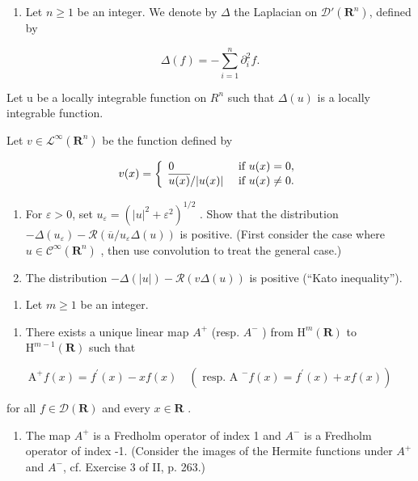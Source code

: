 \begin{enumerate}
\def\labelenumi{\arabic{enumi})}
\setcounter{enumi}{31}
\tightlist
\item
  Let \(n \geqslant 1\) be an integer. We denote by \(\Delta\) the Laplacian on \(\mathcal{D}'(\mathbf{R}^n)\), defined by
\end{enumerate}

\[
\Delta (f) = - \sum_ {i = 1} ^ {n} \partial_ {i} ^ {2} f.
\]

Let u be a locally integrable function on \(R^{n}\) such that \(\Delta(u)\) is a locally integrable function.

Let \(v\in \mathcal{L}^{\infty}(\mathbf{R}^{n})\) be the function defined by

\[
v (x) = \left\{ \begin{array}{l l} 0 & \text { if } u (x) = 0, \\ \overline {{u (x)}} / | u (x) | & \text { if } u (x) \neq 0. \end{array} \right.
\]

\begin{enumerate}
\def\labelenumi{\alph{enumi})}
\item
  For \(\varepsilon > 0\), set \(u_{\varepsilon} = (|u|^2 + \varepsilon^2)^{1/2}\) . Show that the distribution \(-\Delta(u_{\varepsilon}) - \mathcal{R}(\overline{u}/u_{\varepsilon} \Delta(u))\) is positive. (First consider the case where \(u \in \mathcal{C}^{\infty}(\mathbf{R}^{n})\) , then use convolution to treat the general case.)
\item
  The distribution \(-\Delta(|u|) - \mathcal{R}(v\Delta(u))\) is positive (“Kato inequality”).
\end{enumerate}

\begin{enumerate}
\def\labelenumi{\arabic{enumi})}
\setcounter{enumi}{32}
\tightlist
\item
  Let \(m \geqslant 1\) be an integer.
\end{enumerate}

\begin{enumerate}
\def\labelenumi{\alph{enumi})}
\tightlist
\item
  There exists a unique linear map \(A^{+}\) (resp. \(A^{-}\) ) from \(\mathrm{H}^{m}(\mathbf{R})\) to \(\mathrm{H}^{m-1}(\mathbf{R})\) such that
\end{enumerate}

\[
\mathrm{A} ^ {+} f (x) = f ^ {\prime} (x) - x f (x) \quad (\text { resp.   A } ^ {-} f (x) = f ^ {\prime} (x) + x f (x))
\]

for all \(f \in \mathcal{D}(\mathbf{R})\) and every \(x \in \mathbf{R}\) .

\begin{enumerate}
\def\labelenumi{\alph{enumi})}
\setcounter{enumi}{1}
\tightlist
\item
  The map \(A^{+}\) is a Fredholm operator of index 1 and \(A^{-}\) is a Fredholm operator of index -1. (Consider the images of the Hermite functions under \(A^{+}\) and \(A^{-}\), cf. Exercise 3 of II, p. 263.)
\end{enumerate}
\relax{}
